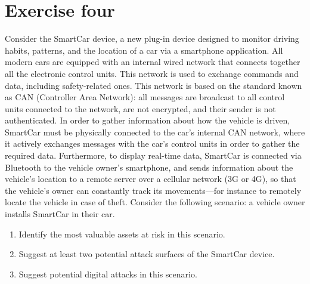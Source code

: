 \section{Exercise four}

Consider the SmartCar device, a new plug-in device designed to monitor driving habits, patterns, and the location of a car via a smartphone application.
All modern cars are equipped with an internal wired network that connects together all the electronic control units. 
This network is used to exchange commands and data, including safety-related ones. 
This network is based on the standard known as CAN (Controller Area Network): all messages are broadcast to all control units connected to the network, are not encrypted, and their sender is not authenticated. 
In order to gather information about how the vehicle is driven, SmartCar must be physically connected to the car's internal CAN network, where it actively exchanges messages with the car's control units in order to gather the required data.
Furthermore, to display real-time data, SmartCar is connected via Bluetooth to the vehicle owner's smartphone, and sends information about the vehicle's location to a remote server over a cellular network (3G or 4G), so that the vehicle's owner can constantly track its movements—for instance to remotely locate the vehicle in case of theft.
Consider the following scenario: a vehicle owner installs SmartCar in their car.
\begin{enumerate}
    \item Identify the most valuable assets at risk in this scenario.
    \item Suggest at least two potential attack surfaces of the SmartCar device.
    \item Suggest potential digital attacks in this scenario.
\end{enumerate}

